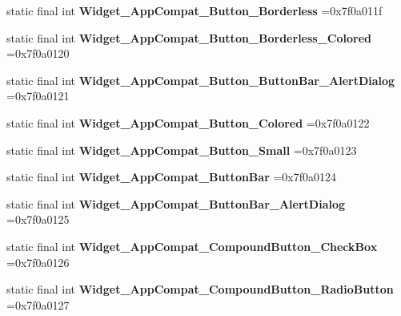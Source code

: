 \begin{DoxyCompactItemize}
static final int {\bfseries Widget\+\_\+\+App\+Compat\+\_\+\+Button\+\_\+\+Borderless} =0x7f0a011f
\item 
\mbox{\label{classproject4_1_1xaria_1_1R_1_1style_a460653c1173bca4828dc7e45e2eb3fbb}} 
static final int {\bfseries Widget\+\_\+\+App\+Compat\+\_\+\+Button\+\_\+\+Borderless\+\_\+\+Colored} =0x7f0a0120
\item 
\mbox{\label{classproject4_1_1xaria_1_1R_1_1style_a0c465fba76b17e52b99bc2c2c149fa68}} 
static final int {\bfseries Widget\+\_\+\+App\+Compat\+\_\+\+Button\+\_\+\+Button\+Bar\+\_\+\+Alert\+Dialog} =0x7f0a0121
\item 
\mbox{\label{classproject4_1_1xaria_1_1R_1_1style_a74e620b8350ea0fbd4b14d76080207ba}} 
static final int {\bfseries Widget\+\_\+\+App\+Compat\+\_\+\+Button\+\_\+\+Colored} =0x7f0a0122
\item 
\mbox{\label{classproject4_1_1xaria_1_1R_1_1style_a7e87ddafb1028a3aae82de3ddd8bc69d}} 
static final int {\bfseries Widget\+\_\+\+App\+Compat\+\_\+\+Button\+\_\+\+Small} =0x7f0a0123
\item 
\mbox{\label{classproject4_1_1xaria_1_1R_1_1style_ab56e6797c9379971fd22b05ddd5e9cfe}} 
static final int {\bfseries Widget\+\_\+\+App\+Compat\+\_\+\+Button\+Bar} =0x7f0a0124
\item 
\mbox{\label{classproject4_1_1xaria_1_1R_1_1style_ae81fc1b4130df8952d314d6f268be9c1}} 
static final int {\bfseries Widget\+\_\+\+App\+Compat\+\_\+\+Button\+Bar\+\_\+\+Alert\+Dialog} =0x7f0a0125
\item 
\mbox{\label{classproject4_1_1xaria_1_1R_1_1style_a7fc24f80d3c69e505ac1559c1a374372}} 
static final int {\bfseries Widget\+\_\+\+App\+Compat\+\_\+\+Compound\+Button\+\_\+\+Check\+Box} =0x7f0a0126
\item 
\mbox{\label{classproject4_1_1xaria_1_1R_1_1style_a92784e64ee318a67c8eb414af3dfe517}} 
static final int {\bfseries Widget\+\_\+\+App\+Compat\+\_\+\+Compound\+Button\+\_\+\+Radio\+Button} =0x7f0a0127

\end{DoxyCompactItemize}
